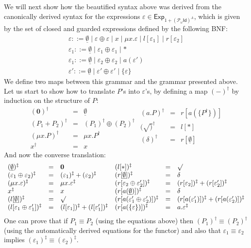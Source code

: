 \documentclass{LMCS}
\def\pow{{\mathcal P_{\!\!\!\omega}}}
\newcommand\E\varepsilon
\newcommand\Exp{\mathsf{Exp}}
\newcommand\id{\mathsf{Id}}
\newcommand\emp{\underline\emptyset}
\theoremstyle{definition}
\theoremstyle{plain}
\theoremstyle{plain}
\theoremstyle{plain}
\theoremstyle{plain}
\theoremstyle{definition}
\theoremstyle{definition}
\begin{document}
We will next show how the beautified syntax above was derived from the
canonically derived syntax for the expressions $\E\in \Exp_{1+(\pow
\id)^A}$, which is given by the set of closed and guarded expressions
defined by the following BNF:
\[
\begin{array}{l}
\E ::= \emp \mid \E\oplus\E \mid x \mid \mu x.\E \mid l[\E_1]
\mid r[\E_2]\\
\E_1 ::= \emp \mid \E_1\oplus\E_1 \mid *\\
\E_1 ::= \emp \mid \E_2\oplus\E_2 \mid a(\E')\\
\E' ::= \emp \mid \E'\oplus\E' \mid \{\E\}
\end{array}
\]
We define two maps between this grammar and the grammar presented above.
Let us start to show how to translate $P$'s into $\E$'s, by defining 
a map $(-)^\dagger$ by induction on the structure of $P$:
$$
\begin{array}{lcl}
(\mathbf{0})^\dagger &=& \emp\\
(P_1+P_2)^\dagger &=&  (P_1)^\dagger \oplus (P_2)^\dagger\\
(\mu x. P)^\dagger &=& \mu x. P^\dagger\\
x^\dagger  &=& x
\end{array}
\begin{array}{lcl}
(a.P)^\dagger &=& r[a(\{P^\dagger\})]\\ 
(\surd)^\dagger &=& l[*] \\
(\delta)^\dagger &=& r[\emp]\\
\end{array}
$$
And now the converse translation:
$$
\begin{array}{lcl}
(\emp)^\ddagger &=& \mathbf{0}\\
(\E_1\oplus\E_2)^\ddagger &=&  (\E_1)^\ddagger + (\E_2)^\ddagger\\
(\mu x. \E)^\ddagger &=& \mu x. \E^\ddagger\\
x^\ddagger  &=& x\\
(l[\emp])^\ddagger &=& \surd \\
(l[\E_1\oplus\E_1'])^\ddagger &=& (l[\E_1])^\ddagger + 
(l[\E_1'])^\ddagger\\
\end{array}
\begin{array}{lcl}
(l[*])^\ddagger &=& \surd \\
(r[\emp])^\ddagger &=& \delta \\ 
(r[\E_2\oplus\E_2'])^\ddagger &=&(r[\E_2])^\ddagger  + (r[\E_2'])^\ddagger\\ 
(r[a(\emp)])^\ddagger &=& \delta \\ 
(r[a(\E_1'\oplus\E_2')])^\ddagger &=&(r[a(\E_1')])^\ddagger + (r[a(\E_2')])^\ddagger \\ 
(r[a(\{\E\})])^\ddagger &=& a.\E^\ddagger \\ 
\end{array}
$$
One can prove that if $P_1\equiv P_2$ (using the equations above) 
then $(P_1)^\dagger\equiv (P_2)^\dagger$  (using the automatically derived equations 
for the functor) and also that  $\E_1\equiv \E_2$ implies $(\E_1)^\ddagger \equiv (\E_2)^\ddagger$. 
\end{document}

